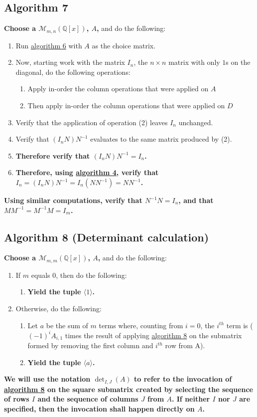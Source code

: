 \documentclass[twocolumn]{article}
\begin{document}
		\subsection{Algorithm 7}\label{sec:algorithm 7}
			\textbf{Choose a $\mathcal{M}_{m,n}(\mathbb{Q}[x])$, $A$,} and do the following:
			\begin{enumerate}
				\item Run \hyperref[sec:algorithm 6]{algorithm 6} with $A$ as the choice matrix.
				\item Now, starting work with the matrix $I_n$, the $n\times n$ matrix with only $1$s on the diagonal, do the following operations:
					\begin{enumerate}
						\item Apply in-order the column operations that were applied on $A$
						\item Then apply in-order the column operations that were applied on $D$
					\end{enumerate}
				\item Verify that the application of operation (2) leaves $I_n$ unchanged.
				\item Verify that $(I_nN)N^{-1}$ evaluates to the same matrix produced by (2).
				\item \textbf{Therefore verify that $(I_nN)N^{-1}=I_n$.}
				\item \textbf{Therefore, using \hyperref[sec:algorithm 4]{algorithm 4}, verify that $I_n=(I_nN)N^{-1}=I_n(NN^{-1})=NN^{-1}$.}
			\end{enumerate}
			\textbf{Using similar computations, verify that $N^{-1}N=I_n$, and that $MM^{-1}=M^{-1}M=I_m$.}
		\subsection{Algorithm 8 (Determinant calculation)}\label{sec:algorithm 8}
			\textbf{Choose a $\mathcal{M}_{m,m}(\mathbb{Q}[x])$, $A$,} and do the following:
			\begin{enumerate}
				\item If $m$ equals $0$, then do the following:
				\begin{enumerate}
					\item \textbf{Yield the tuple $\langle 1\rangle$.}
				\end{enumerate}
				\item Otherwise, do the following:
				\begin{enumerate}
					\item Let $a$ be the sum of $m$ terms where, counting from $i=0$, the $i^{th}$ term is ($(-1)^{i}A_{i,1}$ times the result of applying \hyperref[sec:algorithm 8]{algorithm 8} on the submatrix formed by removing the first column and $i^{th}$ row from A).
					\item \textbf{Yield the tuple $\langle a\rangle$.}
				\end{enumerate}
			\end{enumerate}
			\textbf{We will use the notation $\det_{I,J}(A)$ to refer to the invocation of \hyperref[sec:algorithm 8]{algorithm 8} on the square submatrix created by selecting the sequence of rows $I$ and the sequence of columns $J$ from $A$. If neither $I$ nor $J$ are specified, then the invocation shall happen directly on $A$.}
\end{document}

